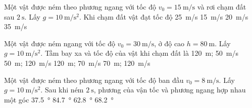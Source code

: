 \begin{ex}
	Một vật được ném theo phương ngang với tốc độ $v_0=\SI{15}{\meter/\second}$ và rơi chạm đất sau $\SI{2}{\second}$. Lấy $g=\SI{10}{\meter/\second^2}$. Khi chạm đất vật đạt tốc độ
	\choice
	{\SI{25}{\meter/\second}}
	{\SI{15}{\meter/\second}}
	{\SI{20}{\meter/\second}}
	{\SI{35}{\meter/\second}}
	\loigiai{}
\end{ex}
\begin{ex}
	Một vật được ném ngang với tốc độ $v_0=\SI{30}{\meter/\second}$, ở độ cao $h=\SI{80}{\meter}$. Lấy $g=\SI{10}{\meter/\second^2}$. Tầm bay xa và tốc độ của vật khi chạm đất là	
	\choice
	{\SI{120}{\meter}; \SI{50}{\meter/\second}}
	{\SI{50}{\meter}; \SI{120}{\meter/\second}}
	{\SI{120}{\meter}; \SI{70}{\meter/\second}}
	{\SI{70}{\meter}; \SI{120}{\meter/\second}}
	\loigiai{}
\end{ex}
\begin{ex}
	Một vật được ném theo phương ngang với tốc độ ban đầu $v_0=\SI{8}{\meter/\second}$. Lấy $g=\SI{10}{\meter/\second^2}$. Sau khi ném $\SI{2}{\second}$, phương của vận tốc và phương ngang hợp nhau một góc 	
	\choice
	{\SI{37.5}{\degree}}
	{\SI{84.7}{\degree}}
	{\SI{62.8}{\degree}}
	{\SI{68.2}{\degree}}
	\loigiai{}
\end{ex}
